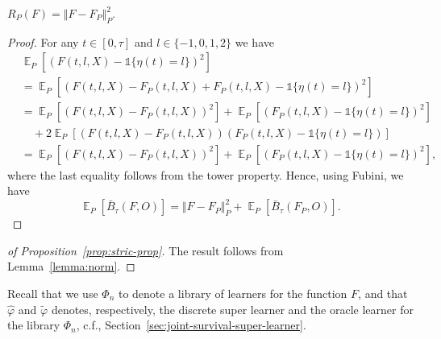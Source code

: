 \documentclass[alpha-refs]{wiley-article}
\DeclareMathOperator{\E}{\mathbb{E}} %
\renewcommand{\phi}{\varphi}
\newcommand{\1}{\mathds{1}}
\begin{document}
\begin{lemma}
  \label{lemma:norm}
  \( R_{P}(F) = \Vert F - F_P \Vert_{P}^2 \).
\end{lemma}
\begin{proof}
  For any \( t \in [0, \tau] \) and \( l\in \{-1,0,1,2\} \) we have
  \begin{align*}
    & \E_{P}{\left[ (F(t, l, X) - \1{\{\eta(t) = l \}})^2 \right]}
    \\
    & =    \E_{P}{\left[ (F(t, l, X) - F_P(t, l, X) + F_P(t, l, X) - \1{\{\eta(t) = l
      \}})^2 \right]}
    \\
    & =    \E_{P}{\left[ (F(t, l, X) - F_P(t, l, X))^2\right]}
      + \E_{P}{\left[ (F_P(t, l, X) - \1{\{\eta(t) = l \}})^2\right]}
    \\
    & \quad
      + 2\E_{P}{\left[ (F(t, l, X) - F_P(t, l, X))(F_P(t, l, X) - \1{\{\eta(t) = l
      \}})\right]}
    \\
    & =    \E_{P}{\left[ (F(t, l, X) - F_P(t, l, X))^2\right]}
      + \E_{P}{\left[ (F_P(t, l, X) - \1{\{\eta(t) = l \}})^2\right]},
  \end{align*}
  where the last equality follows from the tower property. Hence, using Fubini,
  we have
  \begin{equation*}
    \E_P{[\bar{B}_{\tau}(F, O)]}
    = \Vert F - F_P \Vert_{P}^2 + \E_P{[\bar{B}_{\tau}(F_P, O)]}.
  \end{equation*}
\end{proof}

\begin{proof}[of Proposition~\ref{prop:stric-prop}]
  The result follows from Lemma~\ref{lemma:norm}.
\end{proof}

Recall that we use \( \Phi_n \) to denote a library of learners for the
function \( F \), and that \( \hat{\phi} \) and \( \tilde{\phi} \) denotes,
respectively, the discrete super learner and the oracle learner for the library
\( \Phi_n \), c.f., Section~\ref{sec:joint-survival-super-learner}.
\end{document}
